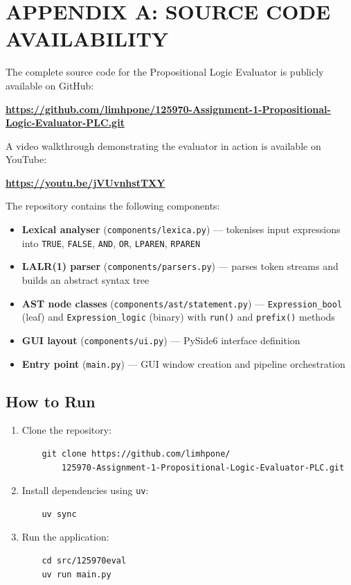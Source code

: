 \chapter*{APPENDIX A: SOURCE CODE AVAILABILITY}

The complete source code for the Propositional Logic Evaluator is publicly available on GitHub:

\begin{center}
\textbf{\url{https://github.com/limhpone/125970-Assignment-1-Propositional-Logic-Evaluator-PLC.git}}
\end{center}

\noindent A video walkthrough demonstrating the evaluator in action is available on YouTube:

\begin{center}
\textbf{\url{https://youtu.be/jVUvnhstTXY}}
\end{center}

The repository contains the following components:

\begin{itemize}
    \item \textbf{Lexical analyser} (\texttt{components/lexica.py}) --- tokenises input expressions into \texttt{TRUE}, \texttt{FALSE}, \texttt{AND}, \texttt{OR}, \texttt{LPAREN}, \texttt{RPAREN}
    \item \textbf{LALR(1) parser} (\texttt{components/parsers.py}) --- parses token streams and builds an abstract syntax tree
    \item \textbf{AST node classes} (\texttt{components/ast/statement.py}) --- \texttt{Expression\_bool} (leaf) and \texttt{Expression\_logic} (binary) with \texttt{run()} and \texttt{prefix()} methods
    \item \textbf{GUI layout} (\texttt{components/ui.py}) --- PySide6 interface definition
    \item \textbf{Entry point} (\texttt{main.py}) --- GUI window creation and pipeline orchestration
\end{itemize}

\section*{How to Run}

\begin{enumerate}
    \item Clone the repository:
    \begin{verbatim}
    git clone https://github.com/limhpone/
        125970-Assignment-1-Propositional-Logic-Evaluator-PLC.git
    \end{verbatim}
    \item Install dependencies using \texttt{uv}:
    \begin{verbatim}
    uv sync
    \end{verbatim}
    \item Run the application:
    \begin{verbatim}
    cd src/125970eval
    uv run main.py
    \end{verbatim}
\end{enumerate}

